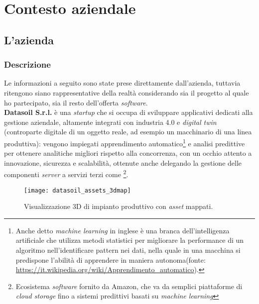 
\chapter{Contesto aziendale}
\label{cap:contesto-aziendale}

\section{L'azienda}
\subsection{Descrizione}
Le informazioni a seguito sono state prese direttamente dall'azienda, tuttavia ritengono siano rappresentative della realtà considerando sia il progetto al quale ho partecipato, sia il resto dell'offerta \textit{software}.\\
\textbf{Datasoil S.r.l.} è una \textit{startup} che si occupa di sviluppare applicativi dedicati alla gestione aziendale, altamente integrati con industria 4.0 e \textit{digital twin} (controparte digitale di un oggetto reale, ad esempio un macchinario di una linea produttiva): vengono impiegati apprendimento automatico\footnote{Anche detto \textit{machine learning} in inglese è una branca dell'intelligenza artificiale che utilizza metodi statistici per migliorare la performance di un algoritmo nell'identificare pattern nei dati, nella quale in una macchina si predispone l'abilità di apprendere in maniera autonoma(fonte: \url{https://it.wikipedia.org/wiki/Apprendimento_automatico}).} e analisi predittive per ottenere analitiche migliori rispetto alla concorrenza, con un occhio attento a innovazione, sicurezza e scalabilità, ottenute anche delegando la gestione delle componenti \textit{server} a servizi terzi come \aws{}\footnote{Ecosistema \textit{software} fornito da Amazon, che va da semplici piattaforme di \textit{cloud storage} fino a sistemi predittivi basati su \textit{machine learning}}.
\begin{figure}[H]
    \centering
    \texttt{[image: datasoil\_assets\_3dmap]}
    \caption[Visualizzazione 3D di impianto produttivo]{Visualizzazione 3D di impianto produttivo con \textit{asset} mappati.\footnotemark}
\end{figure}

